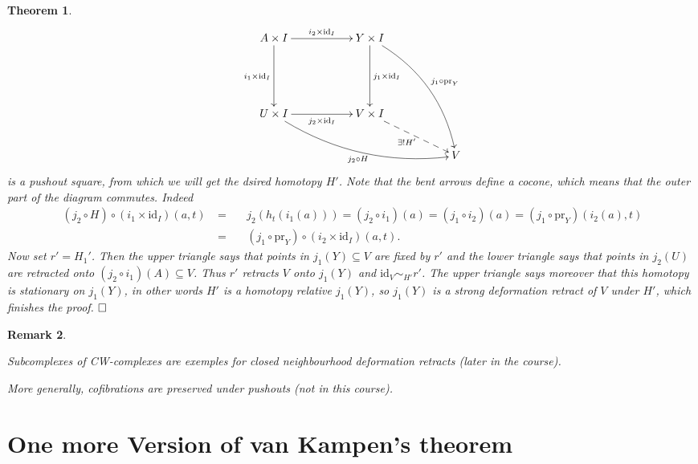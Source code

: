\documentclass[11pt]{book}
\numberwithin{dummy}{section}
\newtheorem{theorem}{Theorem}[section]
\newtheorem{remark}[theorem]{Remark}
\theoremstyle{nonumberbreak}
\newenvironment{pr}[1][]{\ifthenelse{\equal{#1}{}}{\proof}{\proof[#1]}\rm}{\endproof}
\newcommand{\id}{\mathrm{id}}
\begin{document}
\begin{spacing}{1.4}
\begin{theorem}
\begin{pr}
$$
\begin{xy}
\xymatrix{
 A\times I \ar[rr]^{i_2 \times \id_I} \ar[dd]_{i_1 \times \id_I} && Y \times I \ar[dd]^{j_1 \times \id_I} \ar@/^{16pt}/[rrddd]^{j_1 \circ \mathrm{pr}_Y} \\ &&& \\ U \times I \ar[rr]_{j_2 \times \id_I} \ar@/_{16pt}/[rrrrd]_{j_2 \circ H} && V \times I \ar@{-->}[rrd]_{\exists ! H'} && \\ &&&& V
}
\end{xy}
$$
is a pushout square, from which we will get the dsired homotopy $H'$. Note that the bent arrows define a cocone, which means that the outer part of the diagram commutes. Indeed
\begin{alignat*}{5}
(j_2 \circ H) \circ (i_1 \times \id_I)(a,t)\ & =&& \  j_2(h_t(i_1(a))) = (j_2 \circ i_1)(a) = (j_1 \circ i_2)(a) = (j_1 \circ \mathrm{pr}_Y)(i_2(a),t)\\
&=&& \ (j_1 \circ \mathrm{pr}_Y) \circ (i_2 \times \id_I)(a,t).
\end{alignat*}
Now set $r'=H_1'$. Then the upper triangle says that points in $j_1(Y) \subseteq V$ are fixed by $r'$ and the lower triangle says that points in $j_2(U)$ are retracted onto $(j_2 \circ i_1)(A) \subseteq V$. Thus $r'$ retracts $V$ onto $j_1(Y)$ and $\id_V \sim_{H'} r'$. The upper triangle says moreover that this homotopy is stationary on $j_1(Y)$, in other words $H'$ is a homotopy relative $j_1(Y)$, so $j_1(Y)$ is a strong deformation retract of $V$ under $H'$, which finishes the proof. $\hfill \Box$

\end{pr}
\end{theorem}


\begin{remark}
\begin{compactenum}
\item \textit{Subcomplexes} of \textit{CW-complexes} are exemples for closed neighbourhood deformation retracts (later in the course).
\item More generally, \textit{cofibrations} are preserved under pushouts (not in this course).
\end{compactenum}
\end{remark}







\section{One more Version of van Kampen's theorem} %





\end{spacing}
\end{document}

